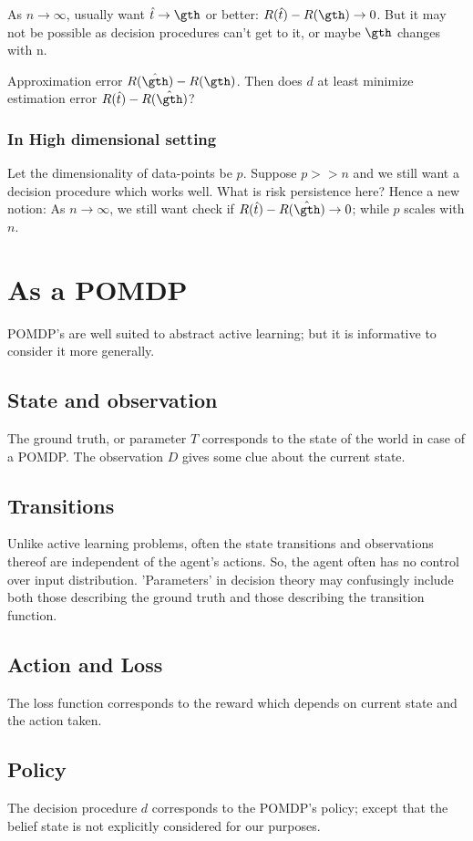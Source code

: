 \documentclass[oneside, article]{memoir}
\begin{document}
As $n \to \infty$, usually want $\hat{t} \to \gth $ or better: $R(\hat{t}) - R(\gth)\to 0$. But it may not be possible as decision procedures can't get to it, or maybe $\gth$ changes with n.

Approximation error $R(\hat{\gth}) - R(\gth)$. Then does $d$ at least minimize estimation error $R(\hat{t}) - R(\hat{\gth})$?

\subsubsection{In High dimensional setting}
Let the dimensionality of data-points be $p$. Suppose $p>>n$ and we still want a decision procedure which works well. What is risk persistence here? Hence a new notion: As $n \to \infty$, we still want check if $R(\hat{t}) - R(\hat{\gth}) \to 0$; while $p$ scales with $n$.


\section{As a POMDP}
POMDP's are well suited to abstract active learning; but it is informative to consider it more generally.

\subsection{State and observation}
The ground truth, or parameter $T$ corresponds to the state of the world in case of a POMDP. The observation $D$ gives some clue about the current state.

\subsection{Transitions}
Unlike active learning problems, often the state transitions and observations thereof are independent of the agent's actions. So, the agent often has no control over input distribution. 'Parameters' in decision theory may confusingly include both those describing the ground truth and those describing the transition function.

\subsection{Action and Loss}
The loss function corresponds to the reward which depends on current state and the action taken.

\subsection{Policy}
The decision procedure $d$ corresponds to the POMDP's policy; except that the belief state is not explicitly considered for our purposes.
\end{document}
